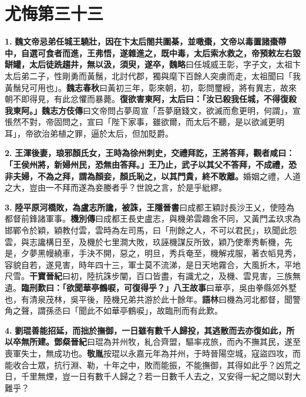 \chapter{尤悔第三十三}

\textbf{1.} \textbf{魏文帝忌弟任城王驍壯，因在卞太后閤共圍棊，並噉棗，文帝以毒置諸棗蔕中，自選可食者而進，王弗悟，遂雜進之，既中毒，太后索水救之，帝預敕左右毀缾罐，太后徒跣趨井，無以汲，須臾，遂卒，}{\footnotesize \textbf{魏略}曰任城威王彰，字子文，太祖卞太后弟二子，性剛勇而黃鬚，北討代郡，獨與麾下百餘人突虜而走，太祖聞曰「我黃鬚兒可用也」。\textbf{魏志春秋}曰黃初三年，彰來朝，初，彰問璽綬，將有異志，故來朝不即得見，有此忿懼而暴薨。}\textbf{復欲害東阿，太后曰：「汝已殺我任城，不得復殺我東阿。」}{\footnotesize \textbf{魏志方伎傳}曰文帝問占夢周宣「吾夢磨錢文，欲滅而愈更明，何謂」，宣悵然不對，帝固問之，宣曰「陛下家事，雖欲爾，而太后不聽，是以欲滅更明耳」，帝欲治弟植之罪，逼於太后，但加貶爵。}

\textbf{2.} \textbf{王渾後妻，琅邪顏氏女，王時為徐州刺史，交禮拜訖，王將答拜，觀者咸曰：「王侯州將，新婦州民，恐無由答拜。」王乃止，武子以其父不答拜，不成禮，恐非夫婦，不為之拜，謂為顏妾，顏氏恥之，以其門貴，終不敢離。}{\footnotesize 婚姻之禮，人道之大，豈由一不拜而遂為妾媵者乎？世說之言，於是乎紕繆。}

\textbf{3.} \textbf{陸平原河橋敗，為盧志所讒，被誅，}{\footnotesize \textbf{王隱晉書}曰成都王穎討長沙王乂，使陸為都督前鋒諸軍事。\textbf{機別傳}曰成都王長史盧志，與機弟雲趣舍不同，又黃門孟玖求為邯鄲令於穎，穎教付雲，雲時為左司馬，曰「刑餘之人，不可以君民」，玖聞此怨雲，與志讒構日至，及機於七里澗大敗，玖誣機謀反所致，穎乃使牽秀斬機，先是，夕夢黑幔繞車，手決不開，惡之，明旦，秀兵奄至，機解戎服，著衣幍見秀，容貌自若，遂見害，時年四十三，軍士莫不流涕，是日天地霧合，大風折木，平地尺雪。\textbf{干寶晉紀}曰初，陸抗誅步闡，百口皆盡，有識尤之，及機、雲見害，三族無遺。}\textbf{臨刑歎曰：「欲聞華亭鶴唳，可復得乎？」}{\footnotesize \textbf{八王故事}曰華亭，吳由拳縣郊外墅也，有清泉茂林，吳平後，陸機兄弟共游於此十餘年。\textbf{語林}曰機為河北都督，聞警角之聲，謂孫丞曰「聞此不如華亭鶴唳」，故臨刑而有此歎。}

\textbf{4.} \textbf{劉琨善能招延，而拙於撫御，一日雖有數千人歸投，其逃散而去亦復如此，所以卒無所建。}{\footnotesize \textbf{鄧粲晉紀}曰琨為并州牧，糺合齊盟，驅率戎旅，而內不撫其民，遂至喪軍失士，無成功也。\textbf{敬胤}按琨以永嘉元年為并州，于時晉陽空城，寇盜四攻，而能收合士眾，抗行淵、勒，十年之中，敗而能振，不能撫御，其得如此乎？凶荒之日，千里無煙，豈一日有數千人歸之？若一日數千人去之，又安得一紀之間以對大難乎？}


